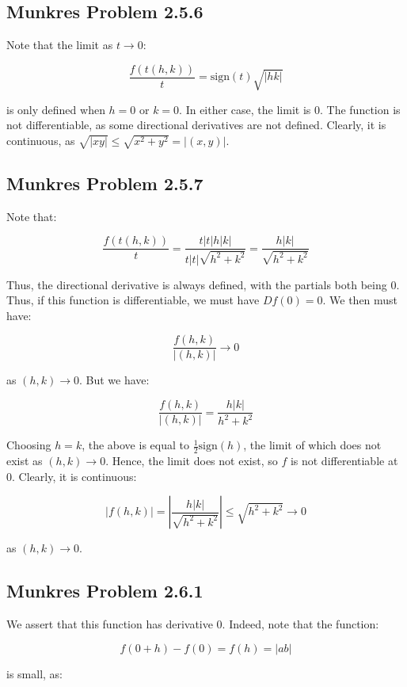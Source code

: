 \documentclass[10pt, oneside]{amsart}
\begin{document}
    \subsection{Munkres Problem 2.5.6}

    Note that the limit as $t \rightarrow 0$:

    $$\frac{f(t(h, k))}{t} = \text{sign}(t) \sqrt{|hk|}$$

    is only defined when $h = 0$ or $k = 0$. In either case, the limit is $0$. The function is not differentiable, as some directional derivatives are not defined. Clearly, it is continuous, as $\sqrt{|xy|} \leq \sqrt{x^2 + y^2} = |(x, y)|$.

    \subsection{Munkres Problem 2.5.7}

    Note that:

    $$\frac{f(t(h, k))}{t} = \frac{t |t| h |k|}{t |t| \sqrt{h^2 + k^2}} = \frac{h |k|}{\sqrt{h^2 + k^2}}$$

    Thus, the directional derivative is always defined, with the partials both being $0$. Thus, if this function is differentiable, we must have $Df(0) = 0$. We then must have:

    $$\frac{f(h, k)}{|(h, k)|} \rightarrow 0$$

    as $(h, k) \rightarrow 0$. But we have:

    $$\frac{f(h, k)}{|(h, k)|} = \frac{h |k|}{h^2 + k^2}$$

    Choosing $h = k$, the above is equal to $\frac{1}{2} \text{sign}(h)$, the limit of which does not exist as $(h, k) \rightarrow 0$. Hence, the limit does not exist, so $f$ is not differentiable at $0$. Clearly,
    it is continuous:

    $$|f(h, k)| = \left| \frac{ h |k|}{\sqrt{h^2 + k^2}} \right| \leq \sqrt{h^2 + k^2} \rightarrow 0$$

    as $(h, k) \rightarrow 0$.

    \subsection{Munkres Problem 2.6.1}

    We assert that this function has derivative $0$. Indeed, note that the function:

    $$f(0 + h) - f(0) = f(h) = |ab|$$

    is small, as:
\end{document}
